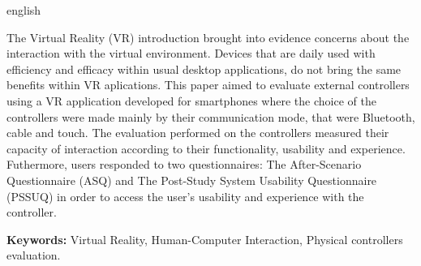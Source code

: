 \documentclass[
	12pt,				%
	openright,			%
	oneside,			%
	a4paper,			%
	english,			%
	french,				%
	spanish,			%
	brazil				%
	]{abntex2}
\begin{document}
\begin{resumo}[Abstract]
 \begin{otherlanguage*}{english}
 
The Virtual Reality (VR) introduction brought into evidence concerns about the interaction with the virtual environment. Devices that are daily used with efficiency and efficacy within usual desktop applications, do not bring the same benefits within VR aplications.
This paper aimed to evaluate external controllers using a VR application developed for smartphones where the choice of the controllers were made mainly by their communication mode, that were Bluetooth, cable and touch. 
The evaluation performed on the controllers measured their capacity of interaction according to their functionality, usability and experience. Futhermore, users responded to two questionnaires: The After-Scenario Questionnaire (ASQ) and The Post-Study System Usability Questionnaire (PSSUQ) in order to access the user's usability and experience with the controller.

\textbf{Keywords:} Virtual Reality, Human-Computer Interaction, Physical controllers evaluation.
 
 \end{otherlanguage*}
\end{resumo}

\listoffigures*
\cleardoublepage

\listoftables*
\cleardoublepage


\tableofcontents*
\cleardoublepage



\pagestyle{simple}







\end{document}
